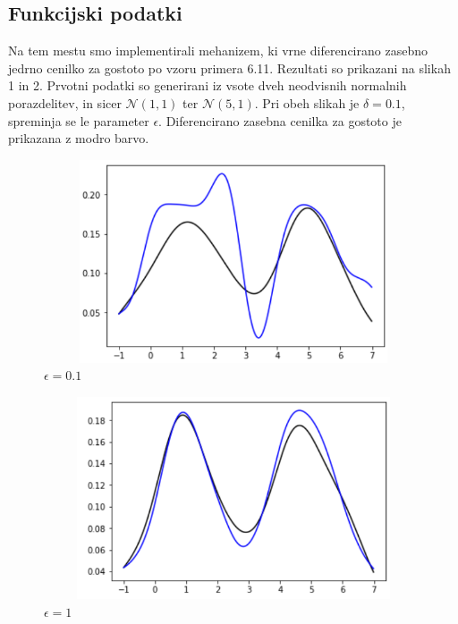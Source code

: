 \documentclass[12pt,a4paper]{amsart}
\theoremstyle{definition} %
\theoremstyle{plain} %
\begin{document}
\subsection{Funkcijski podatki}

Na tem mestu smo implementirali mehanizem, ki vrne diferencirano zasebno jedrno cenilko za gostoto po vzoru primera 6.11. Rezultati so prikazani na slikah 1 in 2. Prvotni podatki so generirani iz vsote dveh neodvisnih normalnih porazdelitev, in sicer $\mathcal{N}(1,1)$ ter $\mathcal{N}(5,1)$. Pri obeh slikah je $\delta = 0.1$, spreminja se le parameter $\epsilon$. Diferencirano zasebna cenilka za gostoto je prikazana z modro barvo.

\begin{figure}[!htb]
\centering
\caption{$\epsilon = 0.1$}
\includegraphics[width = 12cm, height = 6cm]{prva}
\end{figure}

\begin{figure}[!htb]
\centering
\caption{$\epsilon = 1$}
\includegraphics[width = 12cm, height = 6cm]{druga}
\end{figure}
\end{document}
